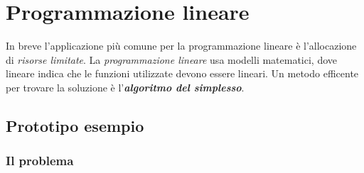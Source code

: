 \documentclass{article}
\begin{document}
\section{Programmazione lineare}
In breve l'applicazione più comune per la programmazione lineare è l'allocazione di \textit{risorse limitate}. La \textit{programmazione lineare} usa modelli matematici, dove lineare indica che le funzioni utilizzate devono essere lineari. Un metodo efficente per trovare la soluzione è l'\textbf{\textit{algoritmo del simplesso}}.

\subsection{Prototipo esempio}
\subsubsection{Il problema}
\end{document}
